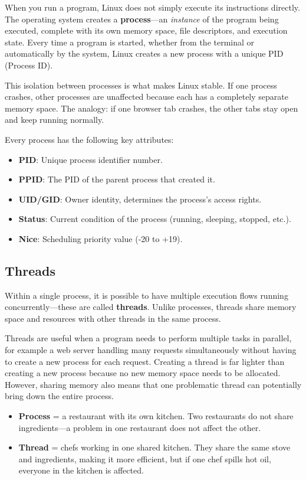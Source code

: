When you run a program, Linux does not simply execute its instructions
directly. The operating system creates a \textbf{process}---an \textit{instance}
of the program being executed, complete with its own memory space, file
descriptors, and execution state. Every time a program is started, whether
from the terminal or automatically by the system, Linux creates a new process
with a unique PID (Process ID).

This isolation between processes is what makes Linux stable. If one process
crashes, other processes are unaffected because each has a completely separate
memory space. The analogy: if one browser tab crashes, the other tabs stay
open and keep running normally.

Every process has the following key attributes:

\begin{itemize}
  \item \textbf{PID}: Unique process identifier number.
  \item \textbf{PPID}: The PID of the parent process that created it.
  \item \textbf{UID/GID}: Owner identity, determines the process's access rights.
  \item \textbf{Status}: Current condition of the process (running, sleeping, stopped, etc.).
  \item \textbf{Nice}: Scheduling priority value (-20 to +19).
\end{itemize}

\subsection{Threads}

Within a single process, it is possible to have multiple execution flows
running concurrently---these are called \textbf{threads}. Unlike processes,
threads share memory space and resources with other threads in the same process.

Threads are useful when a program needs to perform multiple tasks in parallel,
for example a web server handling many requests simultaneously without having
to create a new process for each request. Creating a thread is far lighter than
creating a new process because no new memory space needs to be allocated.
However, sharing memory also means that one problematic thread can potentially
bring down the entire process.

\begin{examplebox}
  \begin{itemize}
    \item \textbf{Process} = a restaurant with its own kitchen. Two restaurants
      do not share ingredients---a problem in one restaurant does not affect
      the other.
    \item \textbf{Thread} = chefs working in one shared kitchen. They share
      the same stove and ingredients, making it more efficient, but if one
      chef spills hot oil, everyone in the kitchen is affected.
  \end{itemize}
\end{examplebox}

